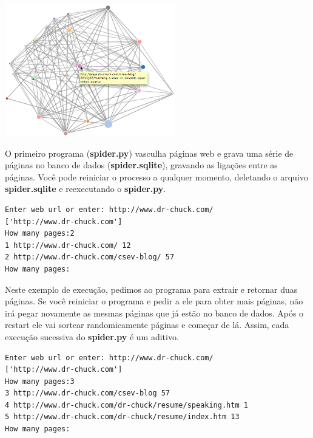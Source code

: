 \beforefig
\centerline{\includegraphics[height=2.25in]{figs2/pagerank.eps}}
\afterfig

O primeiro programa ({\bf spider.py}) vasculha páginas web e grava
uma série de páginas no banco de dados ({\bf spider.sqlite}), gravando
as ligações entre as páginas. Você pode reiniciar o processo a qualquer
momento, deletando o arquivo {\bf spider.sqlite} e reexecutando o {\bf spider.py}.

\beforeverb
\begin{verbatim}
Enter web url or enter: http://www.dr-chuck.com/
['http://www.dr-chuck.com']
How many pages:2
1 http://www.dr-chuck.com/ 12
2 http://www.dr-chuck.com/csev-blog/ 57
How many pages:
\end{verbatim}
\afterverb
%

Neste exemplo de execução, pedimos ao programa para extrair e 
retornar duas páginas. Se você reiniciar o programa e pedir a ele para
obter mais páginas, não irá pegar novamente as mesmas páginas que já
estão no banco de dados. Após o restart ele vai sortear randomicamente
páginas e começar de lá. Assim, cada execução sucessiva do {\bf spider.py}
é um aditivo.

\beforeverb
\begin{verbatim}
Enter web url or enter: http://www.dr-chuck.com/
['http://www.dr-chuck.com']
How many pages:3
3 http://www.dr-chuck.com/csev-blog 57
4 http://www.dr-chuck.com/dr-chuck/resume/speaking.htm 1
5 http://www.dr-chuck.com/dr-chuck/resume/index.htm 13
How many pages:
\end{verbatim}
\afterverb
%

